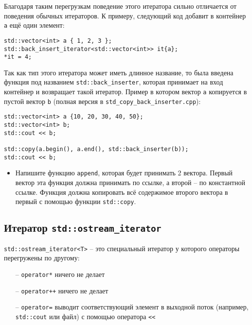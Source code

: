 \documentclass{article}
\begin{document}
Благодаря таким перегрузкам поведение этого итератора сильно отличается от поведения обычных итераторов. К примеру, следующий код добавит в контейнер \texttt{a} ещё один элемент:
\begin{lstlisting}
std::vector<int> a { 1, 2, 3 };
std::back_insert_iterator<std::vector<int>> it{a};
*it = 4;
\end{lstlisting}

Так как тип этого итератора может иметь длинное название, то была введена функция под названием \texttt{std::back\_inserter}, которая принимает на вход контейнер и возвращает такой итератор. Пример в котором вектор \texttt{a} копируется в пустой вектор \texttt{b} (полная версия в \texttt{std\_copy\_back\_inserter.cpp}):
\begin{lstlisting}
std::vector<int> a {10, 20, 30, 40, 50};
std::vector<int> b;
std::cout << b;

std::copy(a.begin(), a.end(), std::back_inserter(b));
std::cout << b;
\end{lstlisting}

\begin{itemize}
\item Напишите функцию \texttt{append}, которая будет принимать 2 вектора. Первый вектор эта функция должна принимать по ссылке, а второй -- по константной ссылке. Функция должна копировать всё содержимое второго вектора в первый с помощью функции \texttt{std::copy}.
\end{itemize}

\subsection*{Итератор \texttt{std::ostream\_iterator}}
\texttt{std::ostream\_iterator<T>} -- это специальный итератор у которого операторы перегружены по другому:
\begin{itemize}
\item[--] \texttt{operator*} ничего не делает
\item[--] \texttt{operator++} ничего не делает
\item[--] \texttt{operator=} выводит соответствующий элемент в выходной поток (например, \texttt{std::cout} или файл) с помощью оператора \texttt{<{}<} 
\end{itemize}
\end{document}
